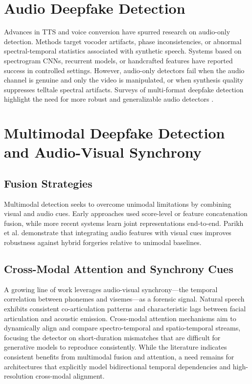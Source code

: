 \section{Audio Deepfake Detection}
Advances in TTS and voice conversion have spurred research on audio-only detection. Methods target vocoder artifacts, phase inconsistencies, or abnormal spectral-temporal statistics associated with synthetic speech. Systems based on spectrogram CNNs, recurrent models, or handcrafted features have reported success in controlled settings. However, audio-only detectors fail when the audio channel is genuine and only the video is manipulated, or when synthesis quality suppresses telltale spectral artifacts. Surveys of multi-format deepfake detection highlight the need for more robust and generalizable audio detectors \cite{mubarak2023survey}.

\section{Multimodal Deepfake Detection and Audio-Visual Synchrony}
\subsection{Fusion Strategies}
Multimodal detection seeks to overcome unimodal limitations by combining visual and audio cues. Early approaches used score-level or feature concatenation fusion, while more recent systems learn joint representations end-to-end. Parikh et al. \cite{parikh2023audio} demonstrate that integrating audio features with visual cues improves robustness against hybrid forgeries relative to unimodal baselines.

\subsection{Cross-Modal Attention and Synchrony Cues}
A growing line of work leverages audio-visual synchrony—the temporal correlation between phonemes and visemes—as a forensic signal. Natural speech exhibits consistent co-articulation patterns and characteristic lags between facial articulation and acoustic emission. Cross-modal attention mechanisms aim to dynamically align and compare spectro-temporal and spatio-temporal streams, focusing the detector on short-duration mismatches that are difficult for generative models to reproduce consistently. While the literature indicates consistent benefits from multimodal fusion and attention, a need remains for architectures that explicitly model bidirectional temporal dependencies and high-resolution cross-modal alignment.

